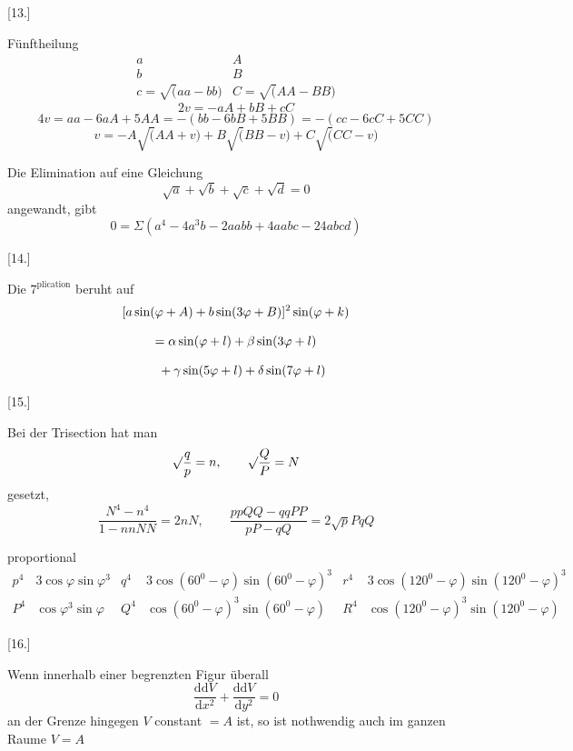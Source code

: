 \par\medskip{}\centerline{[13.]}\nobreak\smallskip
Fünftheilung
\[
\begin{array}{ll}
a&A\\[8pt]
b&B\\[8pt]
c=\surd(aa-bb)&C=\surd(AA-BB)
\end{array}
\]
\[
2v=-aA+bB+cC
\]
\[
4v=aa-6aA+5AA=-(bb-6bB+5BB)=-(cc-6cC+5CC)
\]
\[
v=-A\surd(AA+v)+B\surd(BB-v)+C\surd(CC-v)
\]


Die Elimination auf eine Gleichung
\[
\surd a+\surd b+\surd c+\surd d=0
\]
angewandt, gibt
\[
0=\Sigma(a^4-4a^3b-2aabb+4aabc-24abcd)
\]

\par\medskip{}\centerline{[14.]}\nobreak\smallskip
Die $7^{\mathrm{plication}}$ beruht auf
\[
\begin{gathered}
\relax[a\sin(\varphi+A)+b\sin(3\varphi+B)]^2\sin(\varphi+k)\\[8pt]
=\alpha\sin(\varphi+l)
 +\beta\sin(3\varphi+l)
 \\[8pt]\quad{}+\gamma\sin(5\varphi+l)+\delta\sin(7\varphi+l)
\end{gathered}
\]

\par\medskip{}\centerline{[15.]}\nobreak\smallskip
Bei der Trisection hat man
\[
\surd\frac{q}{p}=n,\qquad \surd\frac{Q}{P}=N
\]
gesetzt,
\[
\frac{N^{4}
 -n^{4}}{1-nnNN}
 =2nN,\qquad
\frac{ppQQ-qqPP}{pP-qQ}=2\surd pPqQ
\]

proportional
\begingroup\small\setlength{\arraycolsep}{1.5pt}\[
\begin{array}{c|l||c|l||c|l}
p^4&3\cos\varphi\sin\varphi^3
&q^4&3\cos(60^0-\varphi)\sin(60^0-\varphi)^3
&r^4&3\cos(120^0-\varphi)\sin(120^0-\varphi)^3\\[8pt]
P^4&\cos\varphi^3\sin\varphi
&Q^4&\cos(60^0-\varphi)^3\sin(60^0-\varphi)
&R^4&\cos(120^0-\varphi)^3\sin(120^0-\varphi)
\end{array}
\]\endgroup

\par\medskip{}\centerline{[16.]}\nobreak\smallskip
Wenn innerhalb einer begrenzten Figur überall
\[
\frac{\mathrm{dd}V}{\mathrm{d}x^2}
+\frac{\mathrm{dd}V}{\mathrm{d}y^2}=0
\]
an der Grenze hingegen $V$ constant $=A$ ist, so ist nothwendig auch im ganzen Raume $V=A$

